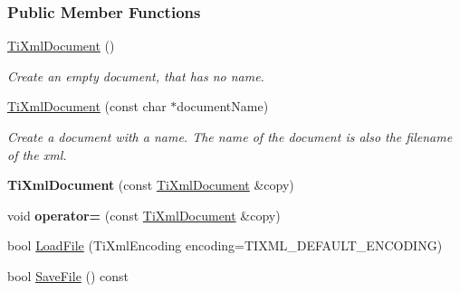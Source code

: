 \subsubsection*{Public Member Functions}
\begin{DoxyCompactItemize}
\item 
\hypertarget{class_ti_xml_document_a9f5e84335708fde98400230f9f12659c}{
\hyperlink{class_ti_xml_document_a9f5e84335708fde98400230f9f12659c}{TiXmlDocument} ()}
\label{class_ti_xml_document_a9f5e84335708fde98400230f9f12659c}

\begin{DoxyCompactList}\small\item\em Create an empty document, that has no name. \item\end{DoxyCompactList}\item 
\hypertarget{class_ti_xml_document_ae4508b452d0c3061db085f3db27b8396}{
\hyperlink{class_ti_xml_document_ae4508b452d0c3061db085f3db27b8396}{TiXmlDocument} (const char $\ast$documentName)}
\label{class_ti_xml_document_ae4508b452d0c3061db085f3db27b8396}

\begin{DoxyCompactList}\small\item\em Create a document with a name. The name of the document is also the filename of the xml. \item\end{DoxyCompactList}\item 
\hypertarget{class_ti_xml_document_a323a7486e7da6099cdc19a5ff7e74b07}{
{\bfseries TiXmlDocument} (const \hyperlink{class_ti_xml_document}{TiXmlDocument} \&copy)}
\label{class_ti_xml_document_a323a7486e7da6099cdc19a5ff7e74b07}

\item 
\hypertarget{class_ti_xml_document_aafbfacc3414008f619b1345775ef12a4}{
void {\bfseries operator=} (const \hyperlink{class_ti_xml_document}{TiXmlDocument} \&copy)}
\label{class_ti_xml_document_aafbfacc3414008f619b1345775ef12a4}

\item 
bool \hyperlink{class_ti_xml_document_a4c852a889c02cf251117fd1d9fe1845f}{LoadFile} (TiXmlEncoding encoding=TIXML\_\-DEFAULT\_\-ENCODING)
\item 
\hypertarget{class_ti_xml_document_a21c0aeb0d0a720169ad4ac89523ebe93}{
bool \hyperlink{class_ti_xml_document_a21c0aeb0d0a720169ad4ac89523ebe93}{SaveFile} () const }
\label{class_ti_xml_document_a21c0aeb0d0a720169ad4ac89523ebe93}


\end{DoxyCompactItemize}
